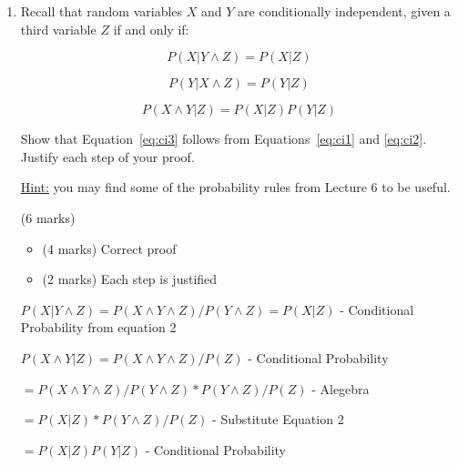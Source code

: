 \documentclass[12pt]{article}
\begin{document}
\begin{enumerate}[font=\Large,label=(\alph*)]

    \item Recall that random variables $X$ and $Y$ are conditionally independent, given a third variable $Z$ if and only if:
    
    \begin{equation}
        P(X|Y \land Z) = P(X|Z)
        \label{eq:ci1}
    \end{equation}
    
    \begin{equation}
        P(Y|X \land Z) = P(Y|Z)
        \label{eq:ci2}
    \end{equation}
    
    \begin{equation}
        P(X \land Y|Z) = P(X|Z)P(Y|Z)
        \label{eq:ci3}
    \end{equation}
    
    Show that Equation~\ref{eq:ci3} follows from Equations~\ref{eq:ci1} and \ref{eq:ci2}. Justify each step of your proof.
    
    \underline{Hint:} you may find some of the probability rules from Lecture 6 to be useful.
    
    \begin{markscheme}
    (6 marks)
    
    \begin{itemize}
    \item
    (4 marks) Correct proof
    \item
    (2 marks) Each step is justified
    \end{itemize}
    \end{markscheme}
    
    \begin{sol}
        {\color{blue} 

            $P(X|Y \land Z) = P(X \land Y \land Z)/P(Y \land Z)= P(X|Z) $  - Conditional Probability from equation 2

            $P(X \land Y|Z) = P(X \land Y \land Z)/P(Z) $  - Conditional Probability  
            
            $ = P(X \land Y \land Z)/ P(Y \land Z) * P(Y \land Z)/P(Z) $  - Alegebra

            $ = P(X|Z) * P(Y \land Z)/P(Z) $  - Substitute Equation 2

            $ = P(X|Z)P(Y|Z) $  - Conditional Probability
        }   
        \end{sol}


\end{enumerate}
\end{document}
